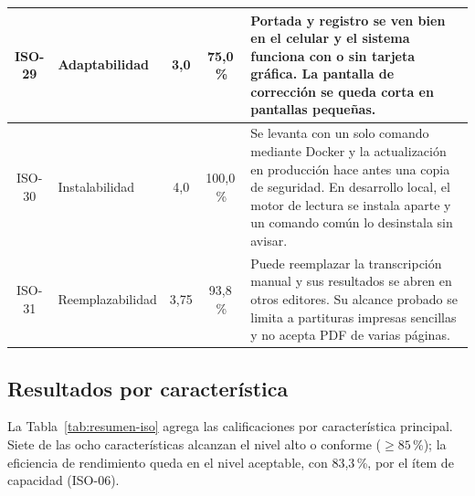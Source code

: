 \documentclass[conference]{IEEEtran}
\begin{document}
\begin{table}[htbp]
\begin{tabular}{|c|p{2.8cm}|c|c|p{9.9cm}|}
\hline
ISO-29 & Adaptabilidad & 3,0 & 75,0\,\% & Portada y registro se ven bien en el celular y el sistema funciona con o sin tarjeta gráfica. La pantalla de corrección se queda corta en pantallas pequeñas. \\
\hline
ISO-30 & Instalabilidad & 4,0 & 100,0\,\% & Se levanta con un solo comando mediante Docker y la actualización en producción hace antes una copia de seguridad. En desarrollo local, el motor de lectura se instala aparte y un comando común lo desinstala sin avisar. \\
\hline
ISO-31 & Reemplazabilidad & 3,75 & 93,8\,\% & Puede reemplazar la transcripción manual y sus resultados se abren en otros editores. Su alcance probado se limita a partituras impresas sencillas y no acepta PDF de varias páginas. \\
\hline
\end{tabular}
\end{table}

\subsection{Resultados por característica}

La Tabla~\ref{tab:resumen-iso} agrega las calificaciones por
característica principal. Siete de las ocho características alcanzan el
nivel alto o conforme ($\geq 85$\,\%); la eficiencia de rendimiento queda en
el nivel aceptable, con 83,3\,\%, por el ítem de capacidad (ISO-06).
\end{document}
